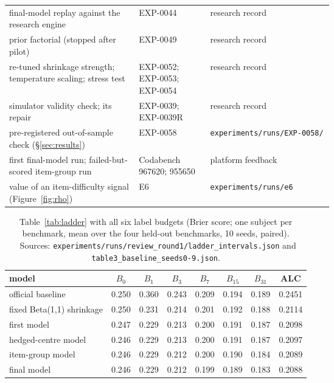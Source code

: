 \documentclass{article}
\newcommand{\src}[1]{{\footnotesize\ Sources: #1.}}
\newcommand{\p}[1]{\nolinkurl{#1}}
\begin{document}
\begin{center}
\begin{tabular}{@{}p{0.40\linewidth}p{0.22\linewidth}l@{}}
final-model replay against the research engine & EXP-0044 & research record\\
prior factorial (stopped after pilot) & EXP-0049 & research record\\
re-tuned shrinkage strength; temperature scaling; stress test & EXP-0052; EXP-0053; EXP-0054 & research record\\
simulator validity check; its repair & EXP-0039; EXP-0039R & research record\\
pre-registered out-of-sample check (\S\ref{sec:results}) & EXP-0058 & \p{experiments/runs/EXP-0058/}\\
first final-model run; failed-but-scored item-group run & Codabench 967620; 955650 & platform feedback\\
value of an item-difficulty signal (Figure~\ref{fig:rho}) & E6 & \texttt{experiments/runs/e6}\\
\bottomrule
\end{tabular}
\end{center}

\begin{table}[h]
  \caption{Table~\ref{tab:ladder} with all six label budgets (Brier score; one subject per benchmark, mean over the
  four held-out benchmarks, 10 seeds, paired).
  \src{\p{experiments/runs/review_round1/ladder_intervals.json} and \p{table3_baseline_seeds0-9.json}}}
  \label{tab:ladder-full}
  \centering\small\setlength{\tabcolsep}{4pt}
  \begin{tabular}{@{}lccccccc@{}}
    \toprule
    model & $B_0$ & $B_1$ & $B_3$ & $B_7$ & $B_{15}$ & $B_{31}$ & ALC\\
    \midrule
    official baseline       & 0.250 & 0.360 & 0.243 & 0.209 & 0.194 & 0.189 & 0.2451\\
    fixed Beta(1,1) shrinkage & 0.250 & 0.231 & 0.214 & 0.201 & 0.192 & 0.188 & 0.2114\\
    first model             & 0.247 & 0.229 & 0.213 & 0.200 & 0.191 & 0.187 & 0.2098\\
    hedged-centre model     & 0.246 & 0.229 & 0.213 & 0.200 & 0.191 & 0.187 & 0.2097\\
    item-group model        & 0.246 & 0.229 & 0.212 & 0.200 & 0.190 & 0.184 & 0.2089\\
    final model             & 0.246 & 0.229 & 0.212 & 0.199 & 0.189 & 0.183 & 0.2088\\
    \bottomrule
  \end{tabular}
\end{table}
\end{document}
